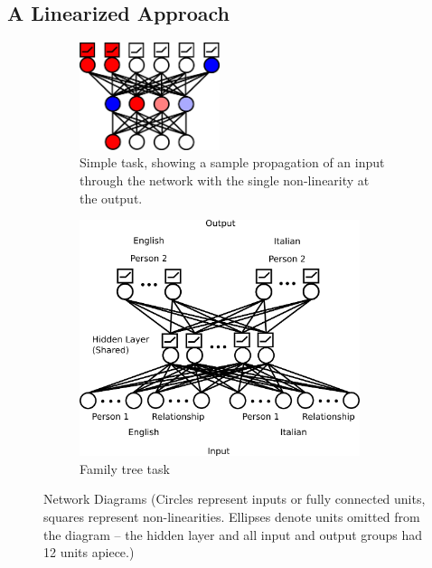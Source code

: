 \documentclass[10pt,letterpaper]{article}
\begin{document}
\subsection{A Linearized Approach}
\begin{figure}
\centering
\begin{subfigure}{0.5\textwidth}
\centering
\includegraphics[width=0.45\textwidth]{figures/network_diagram.png}
\caption{Simple task, showing a sample propagation of an input through the network with the single non-linearity at the output.}
\label{network_diagram}
\vspace*{1em}
\end{subfigure}
\begin{subfigure}{0.5\textwidth}
\centering
\includegraphics[width=0.9\textwidth]{figures/family_tree_network_diagram.png}
\caption{Family tree task}
\label{family_tree_network_diagram}
\end{subfigure}
\caption{Network Diagrams (Circles represent inputs or fully connected units, squares represent non-linearities. Ellipses denote units omitted from the diagram -- the hidden layer and all input and output groups had 12 units apiece.)}
\end{figure}
\end{document}
